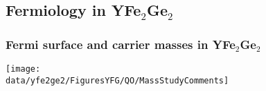 \subsection{Fermiology in YFe$_2$Ge$_2$}
\begin{frame}[plain,label=YFGOverviewFS]
\frametitle{Fermi surface and carrier masses in YFe$_2$Ge$_2$}
\texttt{[image: \\data/yfe2ge2/FiguresYFG/QO/MassStudyComments]}


\end{frame}






